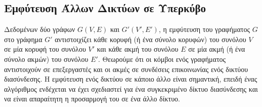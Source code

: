\documentclass[12pt,a4paper]{article} %
\begin{document}
\begin{table}[H]
\centering
\caption{Σύνοψη των χαρακτηριστικών διαφόρων τοπολογιών στατικών δικτύων
που συνδέουν $p$ επεξεργαστές.}
\label{tab:topologies}
\end{table}

\subsection{Εμφύτευση Άλλων Δικτύων σε Υπερκύβο}
Δεδομένων δύο γράφων $G(V,E)$ και $G'(V',E')$, η εμφύτευση του 
γραφήματος $G$ στο γράφημα $G'$ αντιστοιχίζει κάθε κορυφή (ή ένα 
σύνολο κορυφών) του συνόλου $V$ σε μία κορυφή του συνόλου $V'$ και κάθε 
ακμή του συνόλου $E$ σε μία ακμή (ή ένα σύνολο ακμών) του συνόλου $E'$.
Θεωρούμε ότι οι κόμβοι ενός γραφήματος αντιστοιχούν σε επεξεργαστές και 
οι ακμές σε συνδέσεις επικοινωνίας ενός δικτύου διασύνδεσης. Η εμφύτευση
ενός δικτύου σε κάποιο άλλο είναι σημαντική, επειδή ένας αλγόριθμος
ενδέχεται να έχει σχεδιαστεί για ένα συγκεκριμένο δίκτυο διασύνδεσης και
να είναι απαραίτητη η προσαρμογή του σε ένα άλλο δίκτυο.
\end{document}
